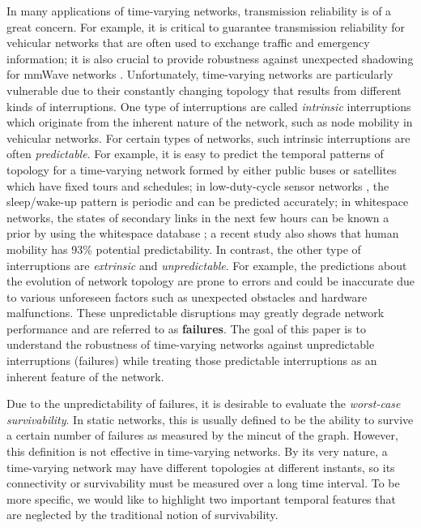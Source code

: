 \documentclass[10pt, conference, letterpaper]{IEEEtran}
\begin{document}
In many applications of time-varying networks, transmission reliability is of a great concern. For example, it is critical to guarantee transmission reliability for vehicular networks that are often used to exchange traffic and emergency information; it is also crucial to provide robustness against unexpected shadowing for mmWave networks \cite{mmWave}.
Unfortunately, time-varying networks are particularly vulnerable due to their constantly changing topology that results from different kinds of interruptions. One type of interruptions are called \emph{intrinsic} interruptions which originate from the inherent nature of the network, such as node mobility in vehicular networks. For certain types of networks, such intrinsic interruptions are often \emph{predictable}. For example, it is easy to predict the temporal patterns of topology for a time-varying network formed by either public buses \cite{vehicular, trace} or satellites \cite{space1, space2} which have fixed tours and schedules; in low-duty-cycle sensor networks \cite{duty1,duty2}, the sleep/wake-up pattern is periodic and can be predicted accurately; in whitespace networks, the states of secondary links in the next few hours can be known a prior by using the whitespace database \cite{databse}; a recent study \cite{human-mobility} also shows that human mobility has 93\% potential predictability.
In contrast, the other type of interruptions are \emph{extrinsic} and \emph{unpredictable}. For example, the predictions about the evolution of network topology are prone to errors and could be inaccurate due to various unforeseen factors such as unexpected obstacles and hardware malfunctions. These unpredictable disruptions may greatly degrade network performance and are referred to as \textbf{failures}.  The goal of this paper is to understand the robustness of time-varying networks against unpredictable interruptions (failures) while treating those predictable interruptions as an inherent feature of the network.


Due to the unpredictability of failures, it is desirable to evaluate the \emph{worst-case survivability}. In static networks, this is usually defined to be the ability to survive a certain number of failures as measured by the mincut of the graph. However, this definition is not effective in time-varying networks. By its very nature, a time-varying network may have different topologies at different instants, so its connectivity or survivability must be measured over a long time interval. To be more specific, we would like to highlight two important temporal features that are neglected by the traditional notion of survivability.
\end{document}
